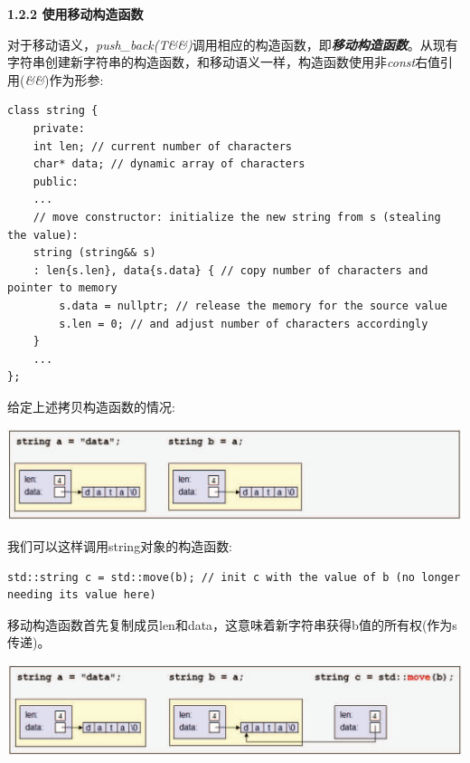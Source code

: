 \hspace*{\fill} \par %
\textbf{1.2.2 使用移动构造函数}

对于移动语义，\textit{push\_back(T\&\&)}调用相应的构造函数，即\textit{\textbf{移动构造函数}}。从现有字符串创建新字符串的构造函数，和移动语义一样，构造函数使用非\textit{const}右值引用(\textit{\&\&})作为形参:\par

\begin{lstlisting}[caption={}]
class string {
	private:
	int len; // current number of characters
	char* data; // dynamic array of characters
	public:
	...
	// move constructor: initialize the new string from s (stealing the value):
	string (string&& s)
	: len{s.len}, data{s.data} { // copy number of characters and pointer to memory
		s.data = nullptr; // release the memory for the source value
		s.len = 0; // and adjust number of characters accordingly
	}
	...
};
\end{lstlisting}

给定上述拷贝构造函数的情况:\par

\begin{center}
	\includegraphics[width=1.0\textwidth]{content/1/chapter1/images/20}
\end{center}

我们可以这样调用string对象的构造函数:\par

\begin{lstlisting}[caption={}]
std::string c = std::move(b); // init c with the value of b (no longer needing its value here)
\end{lstlisting}

移动构造函数首先复制成员len和data，这意味着新字符串获得b值的所有权(作为s传递)。\par

\begin{center}
	\includegraphics[width=1.0\textwidth]{content/1/chapter1/images/21}
\end{center}

